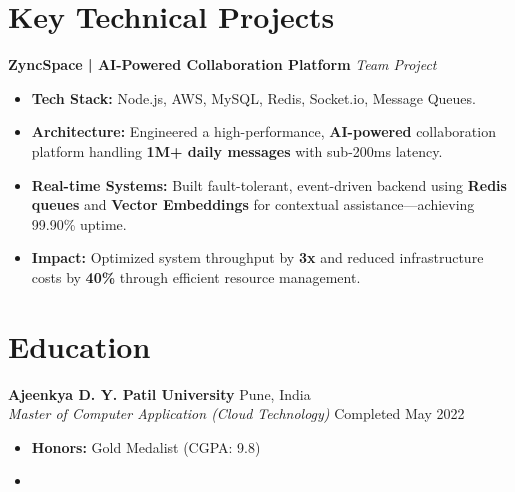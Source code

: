 \documentclass[11pt,a4paper]{article}
\begin{document}
\section{Key Technical Projects}

\noindent \textbf{ZyncSpace | AI-Powered Collaboration Platform} \hfill \textit{Team Project}
\begin{itemize}
    \item \textbf{Tech Stack:} Node.js, AWS, MySQL, Redis, Socket.io, Message Queues.
    \item \textbf{Architecture:} Engineered a high-performance, \textbf{AI-powered} collaboration platform handling \textbf{1M+ daily messages} with sub-200ms latency.
    \item \textbf{Real-time Systems:} Built fault-tolerant, event-driven backend using \textbf{Redis queues} and \textbf{Vector Embeddings} for contextual assistance—achieving 99.90\% uptime.
    \item \textbf{Impact:} Optimized system throughput by \textbf{3x} and reduced infrastructure costs by \textbf{40\%} through efficient resource management.
\end{itemize}

\section{Education}

\noindent \textbf{Ajeenkya D. Y. Patil University} \hfill Pune, India \\
\textit{Master of Computer Application (Cloud Technology)} \hfill Completed May 2022
\begin{itemize}
    \item \textbf{Honors:} Gold Medalist (CGPA: 9.8)
    \item <Add note here if degree was Distance Learning to clarify overlap with work history>
\end{itemize}
\end{document}
